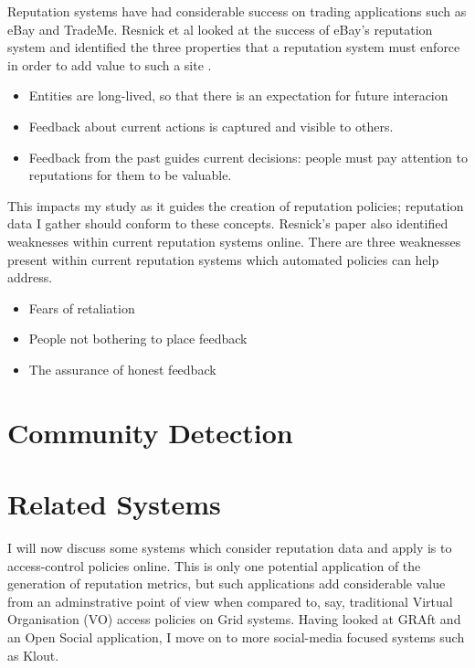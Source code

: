 Reputation systems have had considerable success on trading applications such as eBay and TradeMe. Resnick et al looked at the success of eBay's reputation system and identified the three properties that a reputation system must enforce in order to add value to such a site \cite{}. 

\begin{itemize}
 \item Entities are long-lived, so that there is an expectation for future interacion
 \item Feedback about current actions is captured and visible to others.
 \item Feedback from the past guides current decisions: people must pay attention to reputations for them to be valuable. 
\end{itemize}

This impacts my study as it guides the creation of reputation policies; reputation data I gather should conform to these concepts. Resnick's paper also identified weaknesses within current reputation systems online. There are three weaknesses present within current reputation systems which automated policies can help address. 

\begin{itemize}
 \item Fears of retaliation
 \item People not bothering to place feedback
 \item The assurance of honest feedback
\end{itemize}


\section{Community Detection}

\section{Related Systems}

I will now discuss some systems which consider reputation data and apply is to access-control policies online. This is only one potential application of the generation of reputation metrics, but such applications add considerable value from an adminstrative point of view when compared to, say, traditional Virtual Organisation (VO) access policies on Grid systems. Having looked at GRAft and an Open Social application, I move on to more social-media focused systems such as Klout.

